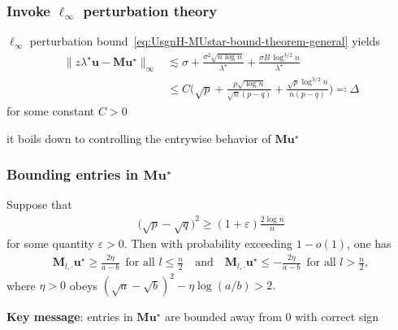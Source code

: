 \documentclass[compress,
mathserif,wide,%
]{beamer}
\begin{document}
\begin{frame}
\frametitle{Invoke $\ell_{\infty}$ perturbation theory}
$\ell_{\infty}$ perturbation bound~\eqref{eq:UsgnH-MUstar-bound-theorem-general} yields
\begin{align*}
	\big\| z\lambda^{\star}\bm{u}-\bm{M}\bm{u}^{\star} \big\|_{\infty} & \lesssim\sigma+\frac{\sigma^{2}\sqrt{n\log n}}{\lambda^{\star}}+\frac{\sigma B\,\log^{3/2}n}{\lambda^{\star}}\nonumber \\
 	& \leq  C \Big( \sqrt{p}+\frac{p\sqrt{\log n}}{\sqrt{n}(p-q)}+\frac{\sqrt{p}\log^{3/2}n}{n(p-q)} \Big) \eqqcolon \Delta
\end{align*}
for some constant $C>0$

\vfill
{

\begin{varblock}[\textwidth]{}
\begin{center}
	it boils down to controlling the entrywise behavior of $\bm{M}\bm{u}^{\star}$
\end{center}
\end{varblock}
}

\end{frame}


\begin{frame}
	\frametitle{Bounding entries in $\bm{M}\bm{u}^{\star}$}	
\begin{lemma}
	\label{lemma:M-ustar-lower-bound-CD}
	Suppose that
\begin{align}
	\big( \sqrt{p} -\sqrt{q}\big)^2 \geq\left( 1+ \varepsilon  \right) \frac{2\log n}{n} 
	\label{eq:H-pq-lower-bound-lemma}
\end{align}
% 
for some quantity $\varepsilon>0$.   
Then with probability exceeding $1- o(1)$, one has
%
\begin{align*}
	 \bm{M}_{l,\cdot}\bm{u}^{\star}   \geq \frac{2\eta}{a - b} \,\,\,\text{for all }l\leq \frac{n}{2}
	\quad\text{and}\quad
	   \bm{M}_{l,\cdot} \bm{u}^{\star}  
	\leq - \frac{2\eta}{a - b} \,\,\, \text{for all } l > \frac{n}{2}, 
\end{align*}
where $\eta > 0$ obeys $(\sqrt{a} - \sqrt{b})^2 - \eta \log (a/b) > 2.$
%
\end{lemma}

\vfill
{\bf Key message}: entries in $\bm{M}\bm{u}^{\star}$ are bounded away from $0$ with correct sign
\end{frame}
\end{document}

